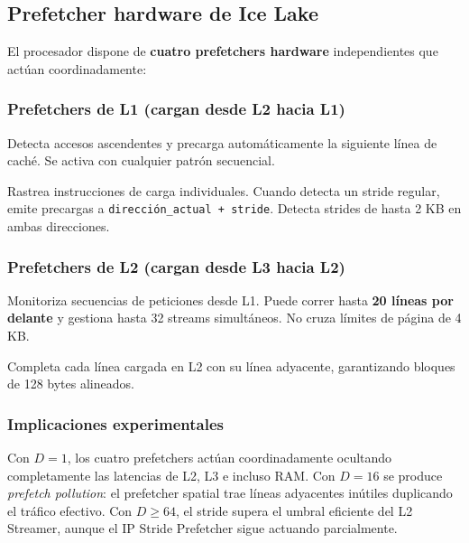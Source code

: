 \documentclass[12pt,a4paper]{article}
\begin{document}
\subsection{Prefetcher hardware de Ice Lake}

El procesador dispone de \textbf{cuatro prefetchers hardware} independientes que actúan coordinadamente:

\subsubsection*{Prefetchers de L1 (cargan desde L2 hacia L1)}

\begin{description}[leftmargin=1.5em]
  \item[DCU Streamer (Next-Line Prefetcher):] Detecta accesos ascendentes y precarga automáticamente la siguiente línea de caché. Se activa con cualquier patrón secuencial.
  \item[DCU IP-based Stride Prefetcher:] Rastrea instrucciones de carga individuales. Cuando detecta un stride regular, emite precargas a \texttt{dirección\_actual + stride}. Detecta strides de hasta 2 KB en ambas direcciones.
\end{description}

\subsubsection*{Prefetchers de L2 (cargan desde L3 hacia L2)}

\begin{description}[leftmargin=1.5em]
  \item[L2 Streamer:] Monitoriza secuencias de peticiones desde L1. Puede correr hasta \textbf{20 líneas por delante} y gestiona hasta 32 streams simultáneos. No cruza límites de página de 4 KB.
  \item[L2 Spatial (Adjacent Cache Line) Prefetcher:] Completa cada línea cargada en L2 con su línea adyacente, garantizando bloques de 128 bytes alineados.
\end{description}

\subsubsection*{Implicaciones experimentales}

Con $D=1$, los cuatro prefetchers actúan coordinadamente ocultando completamente las latencias de L2, L3 e incluso RAM. Con $D=16$ se produce \emph{prefetch pollution}: el prefetcher spatial trae líneas adyacentes inútiles duplicando el tráfico efectivo. Con $D \geq 64$, el stride supera el umbral eficiente del L2 Streamer, aunque el IP Stride Prefetcher sigue actuando parcialmente.
\end{document}
